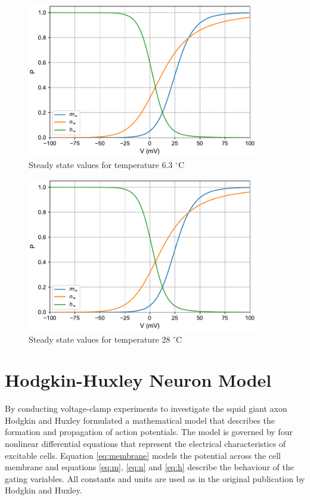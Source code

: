\documentclass{scrartcl}
\begin{document}
\newpage
\begin{figure}[h]
	\centering
	\includegraphics[width=0.9\textwidth]{figures/xinf_temp6.3.pdf}
	\caption{Steady state values for temperature 6.3 $^{\circ}$C}
	\label{fig:xinf_temp6_3}
\end{figure}
\begin{figure}[h!]
	\centering
	\includegraphics[width=0.9\textwidth]{figures/xinf_temp28.pdf}
	\caption{Steady state values for temperature 28 $^{\circ}$C}
	\label{fig:xinf_temp28}
\end{figure}

\newpage
\section{Hodgkin-Huxley Neuron Model}\label{HH}
By conducting voltage-clamp experiments to investigate the squid giant axon Hodgkin and Huxley formulated a mathematical model that describes the formation and propagation of action potentials. The model is governed by four nonlinear differential equations that represent the electrical characteristics of excitable cells. Equation \ref{eq:membrane} models the potential across the cell membrane and equations \ref{eq:m}, \ref{eq:n} and \ref{eq:h} describe the behaviour of the gating variables. All constants and units are used as in the original publication by Hodgkin and Huxley. 
\end{document}
